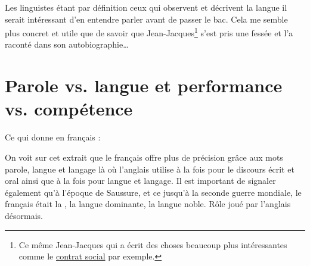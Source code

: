 Les linguistes étant par définition ceux qui observent et décrivent la
langue il serait intéressant d'en entendre parler avant de passer le
bac. Cela me semble plus concret et utile que de savoir que
Jean-Jacques\footnote{Ce même Jean-Jacques qui a écrit des choses
  beaucoup plus intéressantes comme le \href{https://www.rousseauonline.ch/pdf/rousseauonline-0004.pdf}{contrat social} par exemple.} s'est pris une fessée et l'a raconté dans son autobiographie\dots{}

\newpage
\section{Parole vs. langue et performance vs. compétence}

\begin{center}
\begin{mdframed}[style=citestyle, frametitle={Extrait de~\cite{Burleigh}}]
\end{mdframed}  
\end{center}


Ce qui donne en français :

\begin{center}
\begin{mdframed}[style=tradstyle, frametitle={\exFR{Traduction} de l'extrait précédent}]
\end{mdframed}  
\end{center}


On voit sur cet extrait que le français offre plus de précision grâce
aux mots parole, langue et langage là où l'anglais utilise
 à la fois pour le discours écrit et oral ainsi que
 à la fois pour langue et langage. Il est important de
signaler également qu'à l'époque de Saussure, et ce jusqu'à la seconde
guerre mondiale, le français était la , la langue
dominante, la langue noble. Rôle joué par l'anglais désormais. 

